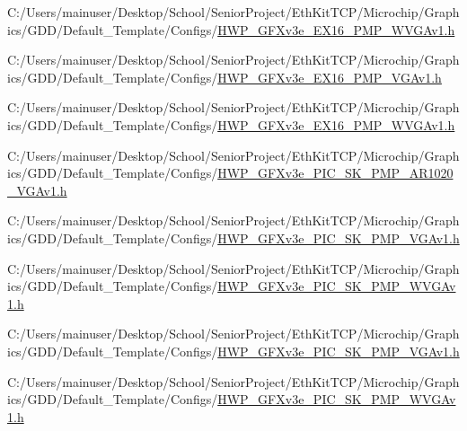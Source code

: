 \begin{DoxyCompactItemize}
C\+:/\+Users/mainuser/\+Desktop/\+School/\+Senior\+Project/\+Eth\+Kit\+T\+C\+P/\+Microchip/\+Graphics/\+G\+D\+D/\+Default\+\_\+\+Template/\+Configs/\hyperlink{_h_w_p___g_f_xv3e___e_x16__16_p_m_p___w_v_g_av1_8h}{H\+W\+P\+\_\+\+G\+F\+Xv3e\+\_\+\+E\+X16\+\_\+P\+M\+P\+\_\+\+W\+V\+G\+Av1.\+h}\item 
C\+:/\+Users/mainuser/\+Desktop/\+School/\+Senior\+Project/\+Eth\+Kit\+T\+C\+P/\+Microchip/\+Graphics/\+G\+D\+D/\+Default\+\_\+\+Template/\+Configs/\hyperlink{_h_w_p___g_f_xv3e___e_x16__8_p_m_p___v_g_av1_8h}{H\+W\+P\+\_\+\+G\+F\+Xv3e\+\_\+\+E\+X16\+\_\+P\+M\+P\+\_\+\+V\+G\+Av1.\+h}\item 
C\+:/\+Users/mainuser/\+Desktop/\+School/\+Senior\+Project/\+Eth\+Kit\+T\+C\+P/\+Microchip/\+Graphics/\+G\+D\+D/\+Default\+\_\+\+Template/\+Configs/\hyperlink{_h_w_p___g_f_xv3e___e_x16__8_p_m_p___w_v_g_av1_8h}{H\+W\+P\+\_\+\+G\+F\+Xv3e\+\_\+\+E\+X16\+\_\+P\+M\+P\+\_\+\+W\+V\+G\+Av1.\+h}\item 
C\+:/\+Users/mainuser/\+Desktop/\+School/\+Senior\+Project/\+Eth\+Kit\+T\+C\+P/\+Microchip/\+Graphics/\+G\+D\+D/\+Default\+\_\+\+Template/\+Configs/\hyperlink{_h_w_p___g_f_xv3e___p_i_c___s_k__16_p_m_p___a_r1020___v_g_av1_8h}{H\+W\+P\+\_\+\+G\+F\+Xv3e\+\_\+\+P\+I\+C\+\_\+\+S\+K\+\_\+P\+M\+P\+\_\+\+A\+R1020\+\_\+\+V\+G\+Av1.\+h}\item 
C\+:/\+Users/mainuser/\+Desktop/\+School/\+Senior\+Project/\+Eth\+Kit\+T\+C\+P/\+Microchip/\+Graphics/\+G\+D\+D/\+Default\+\_\+\+Template/\+Configs/\hyperlink{_h_w_p___g_f_xv3e___p_i_c___s_k__16_p_m_p___v_g_av1_8h}{H\+W\+P\+\_\+\+G\+F\+Xv3e\+\_\+\+P\+I\+C\+\_\+\+S\+K\+\_\+P\+M\+P\+\_\+\+V\+G\+Av1.\+h}\item 
C\+:/\+Users/mainuser/\+Desktop/\+School/\+Senior\+Project/\+Eth\+Kit\+T\+C\+P/\+Microchip/\+Graphics/\+G\+D\+D/\+Default\+\_\+\+Template/\+Configs/\hyperlink{_h_w_p___g_f_xv3e___p_i_c___s_k__16_p_m_p___w_v_g_av1_8h}{H\+W\+P\+\_\+\+G\+F\+Xv3e\+\_\+\+P\+I\+C\+\_\+\+S\+K\+\_\+P\+M\+P\+\_\+\+W\+V\+G\+Av1.\+h}\item 
C\+:/\+Users/mainuser/\+Desktop/\+School/\+Senior\+Project/\+Eth\+Kit\+T\+C\+P/\+Microchip/\+Graphics/\+G\+D\+D/\+Default\+\_\+\+Template/\+Configs/\hyperlink{_h_w_p___g_f_xv3e___p_i_c___s_k__8_p_m_p___v_g_av1_8h}{H\+W\+P\+\_\+\+G\+F\+Xv3e\+\_\+\+P\+I\+C\+\_\+\+S\+K\+\_\+P\+M\+P\+\_\+\+V\+G\+Av1.\+h}\item 
C\+:/\+Users/mainuser/\+Desktop/\+School/\+Senior\+Project/\+Eth\+Kit\+T\+C\+P/\+Microchip/\+Graphics/\+G\+D\+D/\+Default\+\_\+\+Template/\+Configs/\hyperlink{_h_w_p___g_f_xv3e___p_i_c___s_k__8_p_m_p___w_v_g_av1_8h}{H\+W\+P\+\_\+\+G\+F\+Xv3e\+\_\+\+P\+I\+C\+\_\+\+S\+K\+\_\+P\+M\+P\+\_\+\+W\+V\+G\+Av1.\+h}\item 

\end{DoxyCompactItemize}
